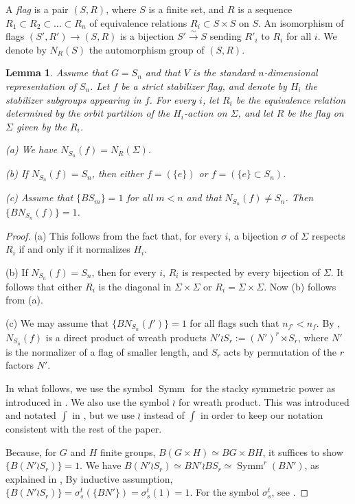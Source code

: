 \documentclass[12 pt]{amsart}
\theoremstyle{plain}
\newtheorem{lemma}[theorem]{Lemma}
\theoremstyle{definition}
\theoremstyle{remark}
\numberwithin{equation}{section}
\DeclareMathOperator\symm{Symm}
\begin{document}
	 A \emph{flag} is a pair $(S,R)$, where $S$ is a finite set, and $R$ is a sequence $R_1\subset R_2\subset\dots\subset R_n$ of equivalence relations $R_i\subset S\times S$ on $S$. An isomorphism of flags $(S',R')\to (S,R)$  is a bijection $S'\xrightarrow{\sim} S$ sending $R'_i$ to $R_i$ for all $i$. We denote by $N_R(S)$ the automorphism group of $(S,R)$. 

\begin{lemma}\label{wreath}
	Assume that $G=S_n$ and that $V$ is the standard $n$-dimensional
	representation of $S_n$. Let $f$ be a strict stabilizer flag, and denote by $H_i$ the stabilizer subgroups appearing in $f$. For every $i$, let $R_i$ be the equivalence relation determined by the orbit partition of the $H_i$-action on $\Sigma$, and let $R$ be the flag on $\Sigma$ given by the $R_i$. 
	
	(a) We have $N_{S_n}(f)=N_R(\Sigma)$.
		
	(b) If $N_{S_n}(f)=S_n$, then either $f=(\{e\})$ or $f=(\{e\}\subset S_n)$.
		
	(c) Assume that $\{BS_m\}=1$ for all $m<n$ and that $N_{S_n}(f)\neq S_n$. Then $\{BN_{S_n}(f)\}=1$. 
\end{lemma}

\begin{proof}
	(a) This follows from the fact that, for every $i$, a bijection $\sigma$ of $\Sigma$ respects $R_i$ if and only if it normalizes $H_i$.
	
	(b) If $N_{S_n}(f)=S_n$, then for every $i$, $R_i$ is respected by every bijection of $\Sigma$. It follows that either $R_i$ is the diagonal in $\Sigma\times \Sigma$ or $R_i=\Sigma\times \Sigma$. Now (b) follows from (a).
	
	(c) We may assume that $\{BN_{S_n}(f')\}=1$ for all flags such that
	$n_{f'}<n_f$. By \cite[Prop.\ 4.2]{ekedahlGeometricInvariantFinite2009},
	$N_{S_n}(f)$ is a direct product of wreath products $N'\wr S_r:=(N')^r\rtimes S_r$, where $N'$ is the normalizer of a flag of smaller length, and $S_r$ acts by permutation of the $r$ factors $N'$. 

	In what follows, we use the symbol $\symm$ for the stacky symmetric power as introduced in \cite[p.
	5]{ekedahlGeometricInvariantFinite2009}.
	We also use the symbol $\wr$ for wreath product. This was introduced and
	notated $\int$ in \cite[p. 5]{ekedahlGeometricInvariantFinite2009},
	but we use $\wr$ instead of $\int$ in order to keep our notation
	consistent with the rest of the paper. 

	Because, for $G$ and $H$ finite groups, $B(G \times H) \simeq BG \times
	BH$, it suffices to show $\{ B(N' \wr S_r)\} = 1$.
We have $B(N' \wr S_r)\simeq BN'\wr BS_r \simeq \symm^r(BN')$,
as explained in \cite[p. 5]{ekedahlGeometricInvariantFinite2009},
By inductive assumption, $\{B(N'\wr S_r)\}=\sigma_s^t(\{BN'\})=\sigma_s^t(1)=1$. For the symbol $\sigma_s^t$, see \cite[Prop.\ 2.5]{ekedahlGeometricInvariantFinite2009}. 
\end{proof}
\end{document}
